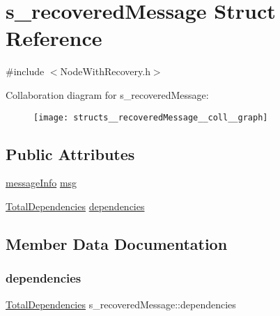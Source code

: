 \hypertarget{structs__recoveredMessage}{}\section{s\+\_\+recovered\+Message Struct Reference}
\label{structs__recoveredMessage}


{\ttfamily \#include $<$Node\+With\+Recovery.\+h$>$}



Collaboration diagram for s\+\_\+recovered\+Message\+:\nopagebreak
\begin{figure}[H]
\begin{center}
\leavevmode
\texttt{[image: structs\_\_recoveredMessage\_\_coll\_\_graph]}
\end{center}
\end{figure}
\subsection*{Public Attributes}
\begin{DoxyCompactItemize}
\item 
\hyperlink{structures_8h_a7e7bdc1d2fff8a9436f2f352b2711ed6}{message\+Info} \hyperlink{structs__recoveredMessage_a585360581eb2222b2a9ec5b91076054a}{msg}
\item 
\hyperlink{classTotalDependencies}{Total\+Dependencies} \hyperlink{structs__recoveredMessage_a95db2608749458c7b7e70bd5b612ba2d}{dependencies}
\end{DoxyCompactItemize}


\subsection{Member Data Documentation}
\mbox{\label{structs__recoveredMessage_a95db2608749458c7b7e70bd5b612ba2d}} 
\subsubsection{\texorpdfstring{dependencies}{dependencies}}
{\footnotesize\ttfamily \hyperlink{classTotalDependencies}{Total\+Dependencies} s\+\_\+recovered\+Message\+::dependencies}

\mbox{\label{structs__recoveredMessage_a585360581eb2222b2a9ec5b91076054a}} 
